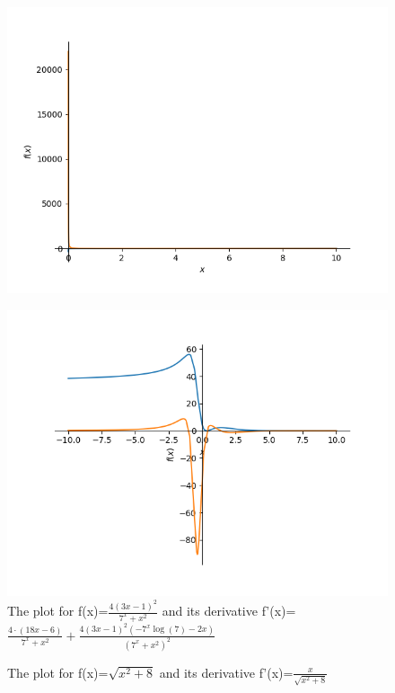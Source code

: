 \documentclass{article}
\begin{document}
\begin{figure}
\includegraphics{plot_12}
\end{figure}\begin{figure}
\caption{The plot for f(x)=$\frac{4 \left(3 x - 1\right)^{2}}{7^{x} + x^{2}}$ and its derivative f'(x)=$\frac{4 \cdot \left(18 x - 6\right)}{7^{x} + x^{2}} + \frac{4 \left(3 x - 1\right)^{2} \left(- 7^{x} \log{\left(7 \right)} - 2 x\right)}{\left(7^{x} + x^{2}\right)^{2}}$}
\centering
\includegraphics{plot_13}
\end{figure}\begin{figure}
\caption{The plot for f(x)=$\sqrt{x^{2} + 8}$ and its derivative f'(x)=$\frac{x}{\sqrt{x^{2} + 8}}$}
\centering

\end{figure}
\end{document}
